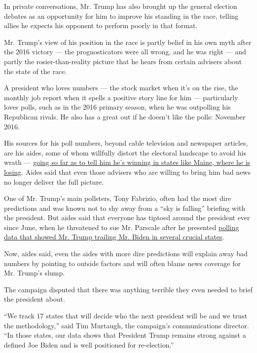 In private conversations, Mr. Trump has also brought up the general
election debates as an opportunity for him to improve his standing in
the race, telling allies he expects his opponent to perform poorly in
that format.

Mr. Trump's view of his position in the race is partly belief in his own
myth after the 2016 victory --- the prognosticators were all wrong, and
he was right --- and partly the rosier-than-reality picture that he
hears from certain advisers about the state of the race.

A president who loves numbers --- the stock market when it's on the
rise, the monthly job report when it spells a positive story line for
him --- particularly loves polls, such as in the 2016 primary season,
when he was outpolling his Republican rivals. He also has a great out if
he doesn't like the polls: November 2016.

His sources for his poll numbers, beyond cable television and newspaper
articles, are his aides, some of whom willfully distort the electoral
landscape to avoid his wrath ---
\href{https://www.nytimes.com/2020/07/02/us/politics/trump-2020-campaign-problems.html}{going
so far as to tell him he's winning in states like Maine, where he is
losing}. Aides said that even those advisers who are willing to bring
him bad news no longer deliver the full picture.

One of Mr. Trump's main pollsters, Tony Fabrizio, often had the most
dire predictions and was known not to shy away from a ``sky is falling''
briefing with the president. But aides said that everyone has tiptoed
around the president ever since June, when he threatened to sue Mr.
Parscale after he presented
\href{https://www.nytimes.com/2020/04/29/us/politics/trump-campaign-reelection-polls.html}{polling
data that showed Mr. Trump trailing Mr. Biden in several crucial
states}.

Now, aides said, even the aides with more dire predictions will explain
away bad numbers by pointing to outside factors and will often blame
news coverage for Mr. Trump's slump.

The campaign disputed that there was anything terrible they even needed
to brief the president about.

``We track 17 states that will decide who the next president will be and
we trust the methodology,'' said Tim Murtaugh, the campaign's
communications director. ``In those states, our data shows that
President Trump remains strong against a defined Joe Biden and is well
positioned for re-election.''

